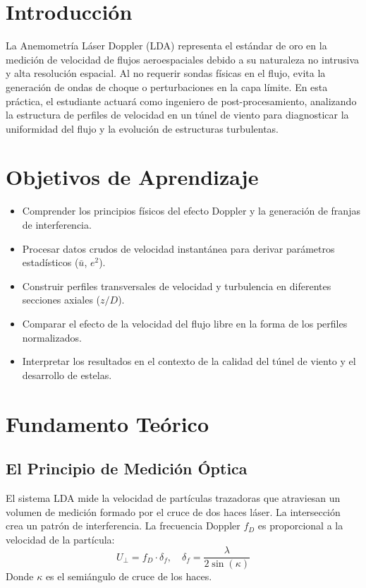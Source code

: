 \documentclass[11pt, a4paper]{article}
\begin{document}
\section{Introducción}
La Anemometría Láser Doppler (LDA) representa el estándar de oro en la medición de velocidad de flujos aeroespaciales debido a su naturaleza no intrusiva y alta resolución espacial. Al no requerir sondas físicas en el flujo, evita la generación de ondas de choque o perturbaciones en la capa límite. En esta práctica, el estudiante actuará como ingeniero de post-procesamiento, analizando la estructura de perfiles de velocidad en un túnel de viento para diagnosticar la uniformidad del flujo y la evolución de estructuras turbulentas.

\section{Objetivos de Aprendizaje}
\begin{itemize}[label=-]
    \item Comprender los principios físicos del efecto Doppler y la generación de franjas de interferencia.
    \item Procesar datos crudos de velocidad instantánea para derivar parámetros estadísticos ($\bar{u}$, $e^2$).
    \item Construir perfiles transversales de velocidad y turbulencia en diferentes secciones axiales ($z/D$).
    \item Comparar el efecto de la velocidad del flujo libre en la forma de los perfiles normalizados.
    \item Interpretar los resultados en el contexto de la calidad del túnel de viento y el desarrollo de estelas.
\end{itemize}

\section{Fundamento Teórico}

\subsection{El Principio de Medición Óptica}
El sistema LDA mide la velocidad de partículas trazadoras que atraviesan un volumen de medición formado por el cruce de dos haces láser. La intersección crea un patrón de interferencia. La frecuencia Doppler $f_D$ es proporcional a la velocidad de la partícula:
\begin{equation}
    U_\perp = f_D \cdot \delta_f, \quad \delta_f = \frac{\lambda}{2 \sin(\kappa)}
\end{equation}
Donde $\kappa$ es el semiángulo de cruce de los haces.
\end{document}
